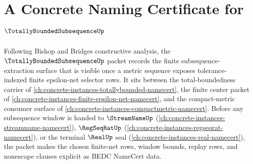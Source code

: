 \chapter{A Concrete Naming Certificate for $\TotallyBoundedSubsequenceUp$}
\label{ch:concrete-instances-totally-bounded-subsequence-namecert}

Following Bishop and Bridges constructive analysis, the $\TotallyBoundedSubsequenceUp$ packet records the finite subsequence-extraction surface that is visible once a metric sequence exposes tolerance-indexed finite epsilon-net selector rows. It sits between the total-boundedness carrier of \autoref{ch:concrete-instances-totallybounded-namecert}, the finite center packet of \autoref{ch:concrete-instances-finite-epsilon-net-namecert}, and the compact-metric consumer surface of \autoref{ch:concrete-instances-compactmetric-namecert}. Before any subsequence window is handed to $\StreamNameUp$ (\autoref{ch:concrete-instances-streamname-namecert}), $\RegSeqRatUp$ (\autoref{ch:concrete-instances-regseqrat-namecert}), or the terminal $\RealUp$ seal (\autoref{ch:concrete-instances-real-namecert}), the packet makes the chosen finite-net rows, window bounds, replay rows, and nonescape clauses explicit as BEDC NameCert data.

